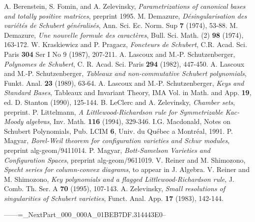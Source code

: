 \begin{thebibliography}{99}
%
 A. Berenstein, S. Fomin, and A. Zelevinsky,
{\em Parametrizations of canonical bases and totally positive matrices},
preprint 1995.
%
%
%
%
  M. Demazure, {\em D\'{e}singularisation des
 vari\'{e}t\'{e}s
 de Schubert g\'{e}n\'{e}ralis\'{e}s}, Ann. Sci. Ec. Norm. Sup
  {\bf 7} (1974), 53-88.
%
 M. Demazure, {\em Une nouvelle formule des
caract\`{e}res}, Bull. Sci. Math. (2)
 {\bf 98} (1974), 163-172.
%
%
%
%
%
 W. Kraskiewicz and P. Pragacz, {\em Foncteurs de Schubert},
C.R. Acad. Sci. Paris {\bf 304} Ser I No 9 (1987), 207-211.
%
 A. Lascoux and M.-P. Schutzenberger,
{\em Polynomes de Schubert}, C. R. Acad. Sci. Paris {\bf 294}
(1982), 447-450.
%
 A. Lascoux and M.-P. Schutzenberger,
{\em Tableaux and non-commutative Schubert polynomials},
Funkt. Anal. {\bf 23}
(1989), 63-64.
%
 A. Lascoux and M.-P. Schutzenberger,
{\em Keys and Standard Bases}, Tableaux and Invariant Theory,
IMA Vol. in Math. and App. {\bf 19},
ed. D. Stanton (1990), 125-144.
%
 B. LeClerc and A. Zelevinsky, {\em Chamber sets}, preprint.
%
 P. Littelmann, {\em A Littlewood-Richardson
rule for Symmetrizable Kac-Moody algebras}, Inv. Math.
{\bf 116} (1994), 329-346.
%
 I.G. Macdonald, Notes on Schubert Polynomials,
Pub. LCIM {\bf 6}, Univ. du Qu\'{e}bec a Montr\'{e}al, 1991.
%
 P. Magyar, {\em Borel-Weil theorem for
configuration varieties and Schur modules}, preprint
alg-geom/9411014.
%
 P. Magyar,
{\em Bott-Samelson Varieties and
Configuration Spaces}, preprint alg-geom/9611019.
%
 V. Reiner and M. Shimozono, {\em Specht series for
column-convex diagrams}, to appear in J. Algebra.
%
 V. Reiner and M. Shimozono, {\em Key polynomials
and a flagged Littlewood-Richardson rule}, J. Comb. Th. Ser. A
{\bf 70} (1995), 107-143.
%
 A. Zelevinsky, {\em Small resolutions of singularities
of Schubert varieties},  Funct. Anal. App. {\bf 17} (1983), 142-144.
%
%
\end{thebibliography}







------=_NextPart_000_000A_01BEB7DF.314443E0--


